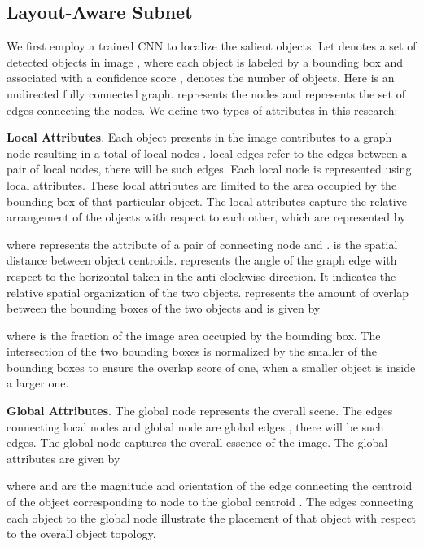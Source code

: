 \documentclass[10pt,twocolumn,letterpaper]{article}
\begin{document}
	\subsection{Layout-Aware Subnet}
	We first employ a trained CNN  \cite{zhang:2015:CVPR:boundingbox} to localize the salient objects. Let  denotes a set of detected objects in image , where each object is labeled by a bounding box  and associated with a confidence score ,  denotes the number of objects.
	Here  is an undirected fully connected graph. 
	 represents the nodes and  represents the set of edges connecting the nodes. We define two types of attributes in this research:
	
	\textbf{Local Attributes}. Each object presents in the image contributes to a graph node resulting in a total of  local nodes . local edges  refer to the edges between a pair of local nodes, there will be  such edges. Each local node is represented using local attributes. These local attributes are limited to the area occupied by the bounding box of that particular object. The local attributes capture the relative arrangement of the objects with respect to each other, which are represented by 
	
	where  represents the attribute of a pair of connecting node  and .  is the spatial distance between object centroids.  represents the angle of the graph edge with respect to the horizontal taken in the anti-clockwise direction. It indicates the relative spatial organization of the two objects.  represents the amount of overlap between the bounding boxes of the two objects and is given by 
	\vspace{-3mm}
	
	where  is the fraction of the image area occupied by the  bounding box. The intersection of the two bounding boxes is normalized by the smaller of the bounding boxes to ensure the overlap score of one, when a smaller object is inside a larger one.
	
	\textbf{Global Attributes}. The global node  represents the overall scene. The edges connecting local nodes and global node are global edges , there will be  such edges.
	The global node captures the overall essence of the image. The global attributes  are given by
	
	where  and  are the magnitude and orientation of the edge connecting the centroid of the object corresponding to node  to the global centroid . The edges connecting each object to the global node illustrate the placement of that object with respect to the overall object topology. 
	
\end{document}
